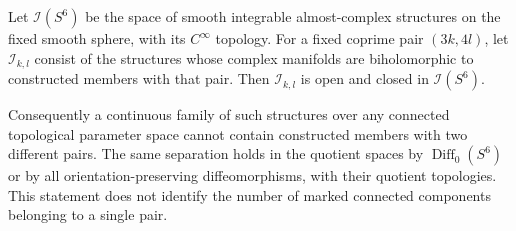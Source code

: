 \begin{corollary}\label{push:src:E.2.24}

Let $\mathcal I(S^6)$ be the space of smooth integrable
almost-complex structures on the fixed smooth sphere,
with its $C^\infty$ topology.  For a fixed coprime pair
$(3k,4l)$, let $\mathcal I_{k,l}$ consist of the structures
whose complex manifolds are biholomorphic to constructed
members with that pair.  Then $\mathcal I_{k,l}$ is open
and closed in $\mathcal I(S^6)$.

Consequently a continuous family of such structures
over any connected topological parameter space cannot
contain constructed members with two different pairs.
The same separation holds in the quotient spaces by
$\operatorname{Diff}_0(S^6)$ or by all orientation-preserving
diffeomorphisms, with their quotient topologies.
This statement does not identify the number of marked
connected components belonging to a single pair.
\end{corollary}
